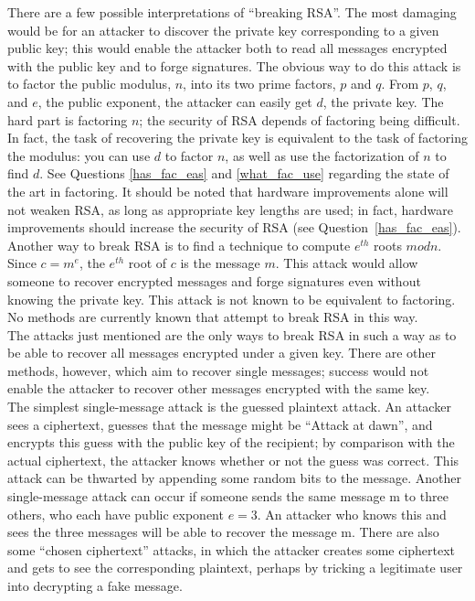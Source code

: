 There are a few possible interpretations of ``breaking RSA''. The most
damaging would be for an attacker to discover the private key corresponding
to a given public key; this would enable the attacker both to read all
messages encrypted with the public key and to forge signatures. The obvious
way to do this attack is to factor the public modulus, $n$, into its two
prime factors, $p$ and $q$. From $p$, $q$, and $e$, the public exponent,
the attacker can easily get $d$, the private key. The hard part is
factoring $n$; the security of RSA depends of factoring being difficult. In
fact, the task of recovering the private key is equivalent to the task of
factoring the modulus: you can use $d$ to factor $n$, as well as use the
factorization of $n$ to find $d$. See Questions \ref{has_fac_eas} and
\ref{what_fac_use} regarding the state of the art in factoring. It should
be noted that hardware improvements alone will not weaken RSA, as long as
appropriate key lengths are used; in fact, hardware improvements should
increase the security of RSA (see Question~\ref{has_fac_eas}).\\

Another way to break RSA is to find a technique to compute $e^{th}$ roots
$mod n$. Since $c=m^e$, the $e^{th}$ root of $c$ is the message $m$. This
attack would allow someone to recover encrypted messages and forge
signatures even without knowing the private key. This attack is not known
to be equivalent to factoring. No methods are currently known that attempt
to break RSA in this way.\\

The attacks just mentioned are the only ways to break RSA in such a way
as to be able to recover all messages encrypted under a given key.
There are other methods, however, which aim to recover single messages;
success would not enable the attacker to recover other messages
encrypted with the same key.\\

The simplest single-message attack is the guessed plaintext attack. An
attacker sees a ciphertext, guesses that the message might be ``Attack
at dawn'', and encrypts this guess with the public key of the
recipient; by comparison with the actual ciphertext, the attacker knows
whether or not the guess was correct. This attack can be thwarted by
appending some random bits to the message. Another single-message
attack can occur if someone sends the same message m to three others,
who each have public exponent $e=3$. An attacker who knows this and sees
the three messages will be able to recover the message m. There are
also some ``chosen ciphertext'' attacks, in which the attacker creates
some ciphertext and gets to see the corresponding plaintext, perhaps by
tricking a legitimate user into decrypting a fake message.\\

